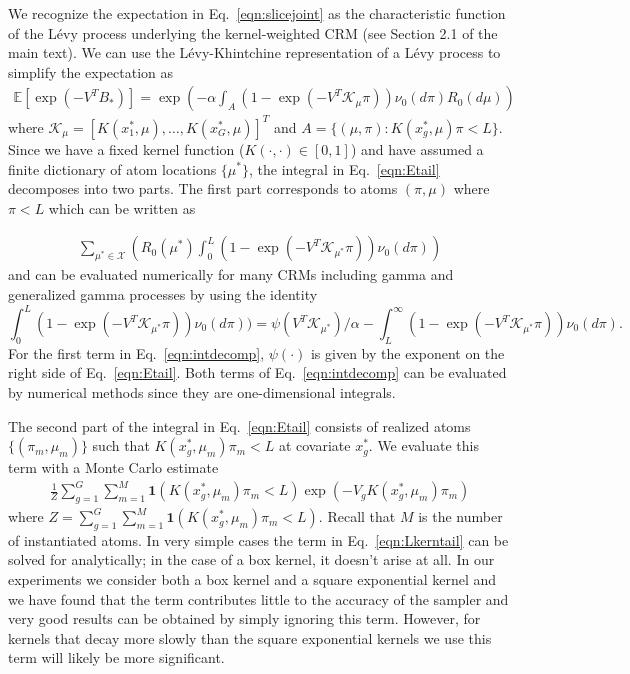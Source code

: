 \documentclass{article} %
\newcommand{\X}{\mathcal{X}}
\newcommand{\idf}[1]{\mathbf 1 \left ( #1 \right )}
\newcommand{\E}{\mathbb{E}}
\newcommand{\K}{\mathcal{K}}
\begin{document}
We recognize the expectation in Eq.~\ref{eqn:slicejoint} as the
characteristic function of the L\'evy process underlying the kernel-weighted
CRM (see Section 2.1 of the main text).  We can use the L\'evy-Khintchine 
representation \cite{FristedtGray:1997} of a
L\'evy process to simplify the expectation as
\begin{equation}
  \begin{aligned}
    \E[\exp{(-V^T B_*)}] = \exp{\left (-\alpha \int_A (1-\exp{(-V^T \K_{\mu}
    \pi)})\nu_0(d\pi)R_0(d\mu)\right )}
  \end{aligned}
  \label{eqn:Etail}
\end{equation}
where $\K_{\mu} = [K(x^*_1,\mu),\ldots,K(x^*_G,\mu)]^T$ and $A = \{(\mu,\pi) :
K(x^*_g,\mu)\pi < L\}$.  Since we have a fixed kernel function
($K(\cdot,\cdot) \in [0,1]$) and have assumed a finite dictionary of atom
locations $\{\mu^*\}$, the integral in Eq.~\ref{eqn:Etail} decomposes into
two parts.  The first part corresponds to atoms
$(\pi,\mu)$ where $\pi < L$ which can be written as

\begin{align}
  \sum_{\mu^* \in \X} \left ( R_0(\mu^*) \int_0^L (1-\exp{(-V^T
  \K_{\mu^*}\pi)})\nu_0(d\pi) \right )
  \label{eqn:Ltail}
\end{align}
and can be evaluated numerically for many CRMs including gamma and generalized
gamma processes \cite{GriffinWalker:2011} by using the identity
\begin{equation}
  \int_0^L (1-\exp{(-V^T \K_{\mu^*}\pi)})\nu_0(d\pi) ) = \psi(V^T
  \K_{\mu^*})/\alpha - \int_L^\infty (1-\exp{(-V^T
  \K_{\mu^*}\pi)})\nu_0(d\pi).
  \label{eqn:intdecomp}
\end{equation}
For the first term in Eq.~\ref{eqn:intdecomp}, $\psi(\cdot)$ is given by the
exponent on the right side of Eq.~\ref{eqn:Etail}.  Both terms of
Eq.~\ref{eqn:intdecomp} can be evaluated by numerical
methods since they are one-dimensional integrals.

The second part of the integral in Eq.~\ref{eqn:Etail} consists of realized atoms 
$\{(\pi_m,\mu_m)\}$ such that 
$K(x^*_g,\mu_m)\pi_m < L$ 
at covariate $x^*_g$.  We evaluate this term with a Monte
Carlo estimate  
\begin{align}
  \frac{1}{Z} \sum_{g=1}^G \sum_{m=1}^M \idf{K(x^*_g,\mu_m)\pi_m < L}
  \exp(-V_gK(x^*_g,\mu_m)\pi_m)
  \label{eqn:Lkerntail}
\end{align}
where $Z = \sum_{g=1}^G \sum_{m=1}^M \idf{K(x^*_g,\mu_m)\pi_m < L}$.  Recall
that $M$ is the number of instantiated atoms.
In very simple cases the term 
in Eq.~\ref{eqn:Lkerntail} can be solved for analytically; in the case
of a box kernel, it doesn't arise at all.  In our experiments we consider both a
box kernel and a square exponential kernel and we have found that the term
contributes little to the accuracy of the sampler and very good results can be
obtained by simply ignoring this term.  However, for kernels that decay more
slowly than the square exponential kernels we use this term will likely
be more significant.
\end{document}
